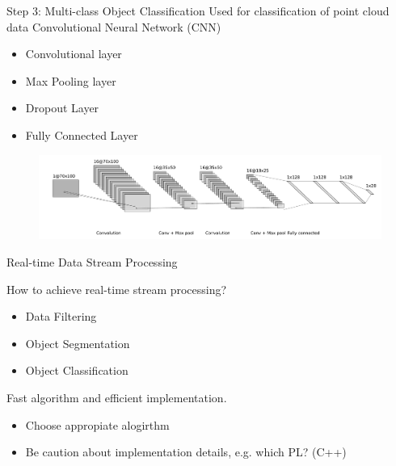 \documentclass[9pt]{beamer}
\begin{document}





\begin{frame}[fragile]{Step 3: Multi-class Object Classification}
	Used for classification of point cloud data Convolutional Neural Network (CNN)

	\begin{itemize}
		\item Convolutional layer
		\item Max Pooling layer
		\item Dropout Layer
		\item Fully Connected Layer
	\end{itemize}

	\begin{figure}
		\centering
		\includegraphics[width=\textwidth]{images/object_net.pdf}

	\end{figure}
\end{frame}





\begin{frame}[fragile]{Real-time Data Stream Processing}
	
	How to achieve real-time stream processing? 

	
\begin{itemize}
	\item {} Data Filtering
	\item {} Object Segmentation
	\item {} Object Classification
\end{itemize}

Fast algorithm and efficient implementation. 

\begin{itemize}
	\item Choose appropiate alogirthm
	\item Be caution about implementation details, e.g. which PL? (C++)
\end{itemize}

\end{frame}
\end{document}
